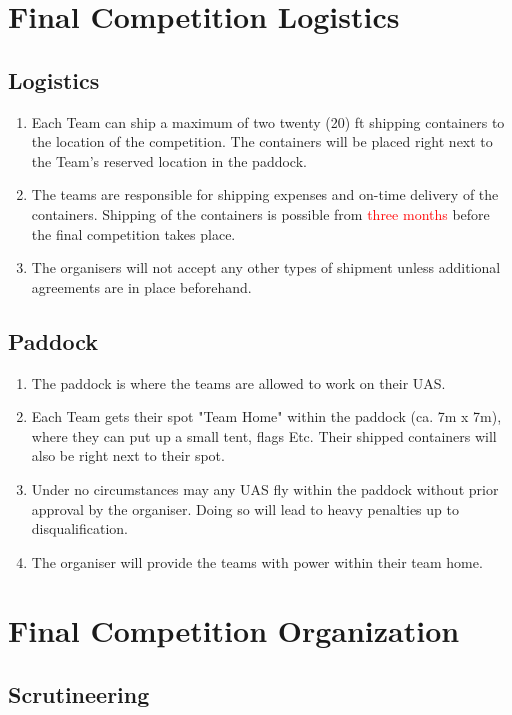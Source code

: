     \section{Final Competition Logistics}
    \subsection{Logistics}
    \begin{enumerate}
      \item Each Team can ship a maximum of two twenty (20) ft shipping containers to the location of the competition. The containers will be placed right next to the Team's reserved location in the paddock.
      \item The teams are responsible for shipping expenses and on-time delivery of the containers. Shipping of the containers is possible from \textcolor{red}{three months }before the final competition takes place.
      \item The organisers will not accept any other types of shipment unless additional agreements are in place beforehand.
    \end{enumerate}

    \subsection{Paddock}
    \begin{enumerate}
      \item The paddock is where the teams are allowed to work on their UAS. 
      \item Each Team gets their spot "Team Home" within the paddock (ca. 7m x 7m), where they can put up a small tent, flags Etc. Their shipped containers will also be right next to their spot. 
      \item Under no circumstances may any UAS fly within the paddock without prior approval by the organiser. Doing so will lead to heavy penalties up to disqualification. 
      \item The organiser will provide the teams with power within their team home.    
    \end{enumerate}


    \section{Final Competition Organization}

    \subsection{Scrutineering}

